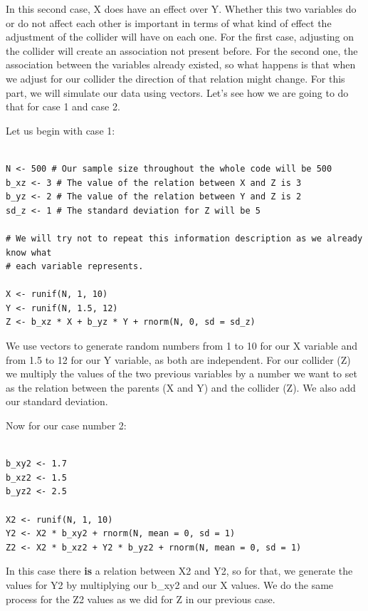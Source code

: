 \documentclass{article}
\begin{document}
In this second case, X does have an effect over Y. Whether this two variables do or do not affect each other is important in terms of what kind of effect the adjustment of the collider will have on each one. For the first case, adjusting on the collider will create an association not present before. For the second one, the association between the variables already existed, so what happens is that when we adjust for our collider the direction of that relation might change. 
For this part, we will simulate our data using vectors. Let's see how we are going to do that for case 1 and case 2.

Let us begin with case 1:

\begin{lstlisting}

N <- 500 # Our sample size throughout the whole code will be 500
b_xz <- 3 # The value of the relation between X and Z is 3
b_yz <- 2 # The value of the relation between Y and Z is 2
sd_z <- 1 # The standard deviation for Z will be 5

# We will try not to repeat this information description as we already know what
# each variable represents.

X <- runif(N, 1, 10)
Y <- runif(N, 1.5, 12)
Z <- b_xz * X + b_yz * Y + rnorm(N, 0, sd = sd_z)

\end{lstlisting}

We use vectors to generate random numbers from 1 to 10 for our X variable and from 1.5 to 12 for our Y variable, as both are independent. For our collider (Z) we multiply the values of the two previous variables by a number we want to set as the relation between the parents (X and Y) and the collider (Z). We also add our standard deviation.

Now for our case number 2:

\begin{lstlisting}

b_xy2 <- 1.7 
b_xz2 <- 1.5
b_yz2 <- 2.5

X2 <- runif(N, 1, 10)
Y2 <- X2 * b_xy2 + rnorm(N, mean = 0, sd = 1)
Z2 <- X2 * b_xz2 + Y2 * b_yz2 + rnorm(N, mean = 0, sd = 1)

\end{lstlisting}

In this case there \textbf{is} a relation between X2 and Y2, so for that, we  generate the values for Y2 by multiplying our b\_xy2 and our X values. We  do the same process for the Z2 values as we did for Z in our previous case.
\end{document}
